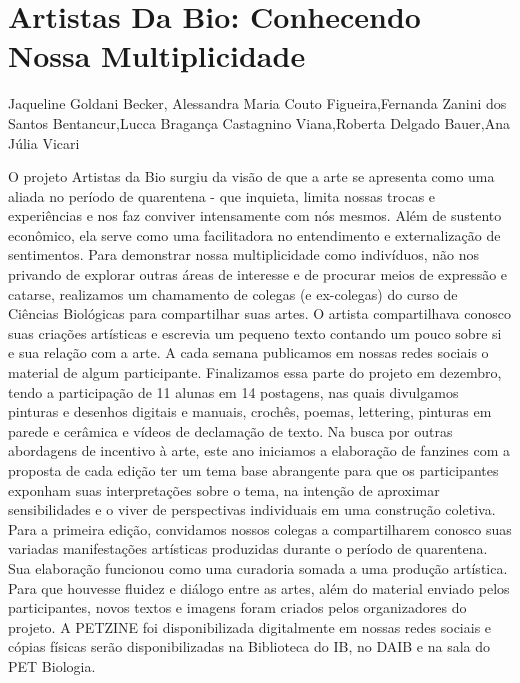 


\section*{Artistas Da Bio: Conhecendo Nossa Multiplicidade}

Jaqueline Goldani Becker, Alessandra Maria Couto Figueira,Fernanda Zanini dos Santos Bentancur,Lucca Bragança Castagnino Viana,Roberta Delgado Bauer,Ana Júlia Vicari

O projeto Artistas da Bio surgiu da visão de que a arte se apresenta como uma aliada no período 
de quarentena - que inquieta, limita nossas trocas e experiências e nos faz conviver intensamente 
com nós mesmos. Além de sustento econômico, ela serve como uma facilitadora no entendimento 
e externalização de sentimentos. Para demonstrar nossa multiplicidade como indivíduos, não nos 
privando de explorar outras áreas de interesse e de procurar meios de expressão e catarse, 
realizamos um chamamento de colegas (e ex-colegas) do curso de Ciências Biológicas para 
compartilhar suas artes. O artista compartilhava conosco suas criações artísticas e escrevia um 
pequeno texto contando um pouco sobre si e sua relação com a arte. A cada semana publicamos 
em nossas redes sociais o material de algum participante. Finalizamos essa parte do projeto em 
dezembro, tendo a participação de 11 alunas em 14 postagens, nas quais divulgamos pinturas e 
desenhos digitais e manuais, crochês, poemas, lettering, pinturas em parede e cerâmica e vídeos 
de declamação de texto. Na busca por outras abordagens de incentivo à arte, este ano iniciamos a 
elaboração de fanzines com a proposta de cada edição ter um tema base abrangente para que os 
participantes exponham suas interpretações sobre o tema, na intenção de aproximar sensibilidades 
e o viver de perspectivas individuais em uma construção coletiva. Para a primeira edição, 
convidamos nossos colegas a compartilharem conosco suas variadas manifestações artísticas 
produzidas durante o período de quarentena. Sua elaboração funcionou como uma curadoria 
somada a uma produção artística. Para que houvesse fluidez e diálogo entre as artes, além do 
material enviado pelos participantes, novos textos e imagens foram criados pelos organizadores 
do projeto. A PETZINE foi disponibilizada digitalmente em nossas redes sociais e cópias físicas 
serão disponibilizadas na Biblioteca do IB, no DAIB e na sala do PET Biologia.

